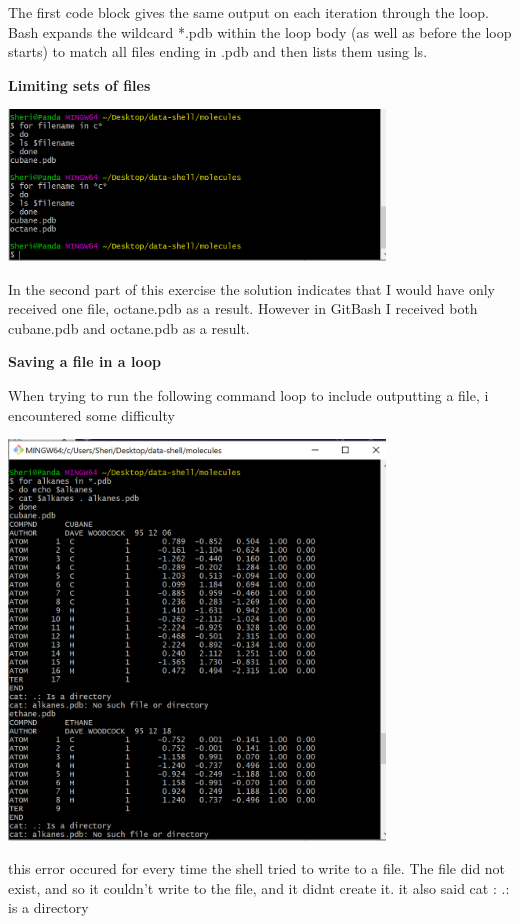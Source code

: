 \documentclass{article}
\begin{document}
The first code block gives the same output on each iteration through the loop. Bash expands the wildcard *.pdb within the loop body (as well as before the loop starts) to match all files ending in .pdb and then lists them using ls. 

\textbf{Limiting sets of files}

\includegraphics[width=10cm]{Images/GitBash_045.PNG}

In the second part of this exercise the solution indicates that I would have only received one file, octane.pdb as a result. However in GitBash I received both cubane.pdb and octane.pdb as a result.

\textbf{Saving a file in a loop}
\label{Error: Saving file in a loop}

When trying to run the following command loop to include outputting a file, i encountered some difficulty

\includegraphics[width=10cm]{Images/GitBash_046.PNG}

this error occured for every time the shell tried to write to a file. The file did not exist, and so it couldn't write to the file, and it didnt create it.
it also said cat : .: is a directory
\end{document}
